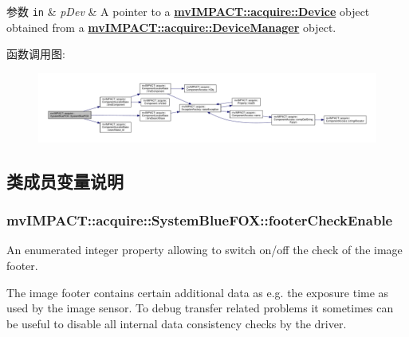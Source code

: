 \begin{DoxyParams}[1]{参数}
\mbox{\tt in}  & {\em p\+Dev} & A pointer to a {\bfseries \hyperlink{classmv_i_m_p_a_c_t_1_1acquire_1_1_device}{mv\+I\+M\+P\+A\+C\+T\+::acquire\+::\+Device}} object obtained from a {\bfseries \hyperlink{classmv_i_m_p_a_c_t_1_1acquire_1_1_device_manager}{mv\+I\+M\+P\+A\+C\+T\+::acquire\+::\+Device\+Manager}} object. \\
\hline
\end{DoxyParams}


函数调用图\+:
\nopagebreak
\begin{figure}[H]
\begin{center}
\leavevmode
\includegraphics[width=350pt]{classmv_i_m_p_a_c_t_1_1acquire_1_1_system_blue_f_o_x_ac039cd80970d6004a1676410f26d651b_cgraph}
\end{center}
\end{figure}




\subsection{类成员变量说明}
\hypertarget{classmv_i_m_p_a_c_t_1_1acquire_1_1_system_blue_f_o_x_ae43ca8f81b19321fa9318256ef0d1f2e}{
\subsubsection[{footer\+Check\+Enable}]{ mv\+I\+M\+P\+A\+C\+T\+::acquire\+::\+System\+Blue\+F\+O\+X\+::footer\+Check\+Enable}}\label{classmv_i_m_p_a_c_t_1_1acquire_1_1_system_blue_f_o_x_ae43ca8f81b19321fa9318256ef0d1f2e}


An enumerated integer property allowing to switch on/off the check of the image footer. 

The image footer contains certain additional data as e.\+g. the exposure time as used by the image sensor. To debug transfer related problems it sometimes can be useful to disable all internal data consistency checks by the driver.

